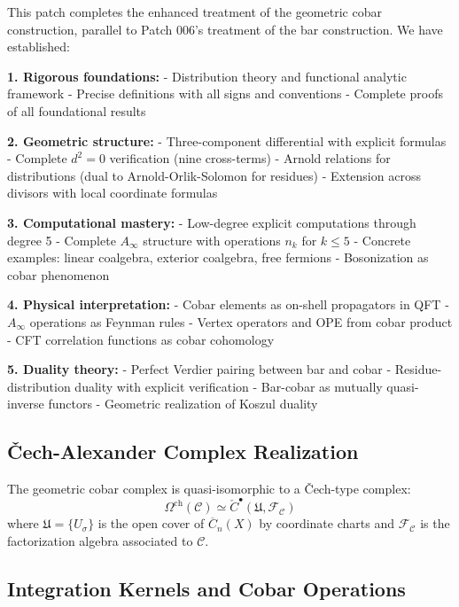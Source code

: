 \begin{remark}
This patch completes the enhanced treatment of the geometric cobar construction, 
parallel to Patch 006's treatment of the bar construction. We have established:

\textbf{1. Rigorous foundations:}
- Distribution theory and functional analytic framework
- Precise definitions with all signs and conventions
- Complete proofs of all foundational results

\textbf{2. Geometric structure:}
- Three-component differential with explicit formulas
- Complete $d^2 = 0$ verification (nine cross-terms)
- Arnold relations for distributions (dual to Arnold-Orlik-Solomon for residues)
- Extension across divisors with local coordinate formulas

\textbf{3. Computational mastery:}
- Low-degree explicit computations through degree 5
- Complete $A_\infty$ structure with operations $n_k$ for $k \leq 5$
- Concrete examples: linear coalgebra, exterior coalgebra, free fermions
- Bosonization as cobar phenomenon

\textbf{4. Physical interpretation:}
- Cobar elements as on-shell propagators in QFT
- $A_\infty$ operations as Feynman rules
- Vertex operators and OPE from cobar product
- CFT correlation functions as cobar cohomology

\textbf{5. Duality theory:}
- Perfect Verdier pairing between bar and cobar
- Residue-distribution duality with explicit verification
- Bar-cobar as mutually quasi-inverse functors
- Geometric realization of Koszul duality
\end{remark}

\subsection{Čech-Alexander Complex Realization}

\begin{theorem}\label{thm:cobar-cech}
The geometric cobar complex is quasi-isomorphic to a Čech-type complex:
\[
\Omega^{\text{ch}}(\mathcal{C}) \simeq \check{C}^{\bullet}(\mathfrak{U}, \mathcal{F}_{\mathcal{C}})
\]
where $\mathfrak{U} = \{U_{\sigma}\}$ is the open cover of $\overline{C}_n(X)$ by coordinate charts and $\mathcal{F}_{\mathcal{C}}$ is the factorization algebra associated to $\mathcal{C}$.
\end{theorem}

\subsection{Integration Kernels and Cobar Operations}

